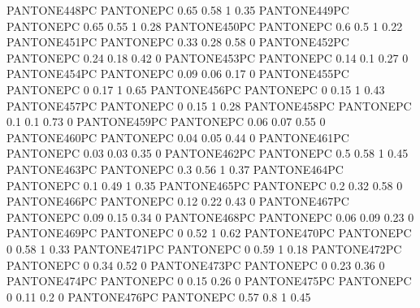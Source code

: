  {PANTONE448PC} {PANTONE\SpotSpace PC} {0.65 0.58 1 0.35}
 {PANTONE449PC} {PANTONE\SpotSpace PC} {0.65 0.55 1 0.28}
 {PANTONE450PC} {PANTONE\SpotSpace PC} {0.6 0.5 1 0.22}
 {PANTONE451PC} {PANTONE\SpotSpace PC} {0.33 0.28 0.58 0}
 {PANTONE452PC} {PANTONE\SpotSpace PC} {0.24 0.18 0.42 0}
 {PANTONE453PC} {PANTONE\SpotSpace PC} {0.14 0.1 0.27 0}
 {PANTONE454PC} {PANTONE\SpotSpace PC} {0.09 0.06 0.17 0}
 {PANTONE455PC} {PANTONE\SpotSpace PC} {0 0.17 1 0.65}
 {PANTONE456PC} {PANTONE\SpotSpace PC} {0 0.15 1 0.43}
 {PANTONE457PC} {PANTONE\SpotSpace PC} {0 0.15 1 0.28}
 {PANTONE458PC} {PANTONE\SpotSpace PC} {0.1 0.1 0.73 0}
 {PANTONE459PC} {PANTONE\SpotSpace PC} {0.06 0.07 0.55 0}
 {PANTONE460PC} {PANTONE\SpotSpace PC} {0.04 0.05 0.44 0}
 {PANTONE461PC} {PANTONE\SpotSpace PC} {0.03 0.03 0.35 0}
 {PANTONE462PC} {PANTONE\SpotSpace PC} {0.5 0.58 1 0.45}
 {PANTONE463PC} {PANTONE\SpotSpace PC} {0.3 0.56 1 0.37}
 {PANTONE464PC} {PANTONE\SpotSpace PC} {0.1 0.49 1 0.35}
 {PANTONE465PC} {PANTONE\SpotSpace PC} {0.2 0.32 0.58 0}
 {PANTONE466PC} {PANTONE\SpotSpace PC} {0.12 0.22 0.43 0}
 {PANTONE467PC} {PANTONE\SpotSpace PC} {0.09 0.15 0.34 0}
 {PANTONE468PC} {PANTONE\SpotSpace PC} {0.06 0.09 0.23 0}
 {PANTONE469PC} {PANTONE\SpotSpace PC} {0 0.52 1 0.62}
 {PANTONE470PC} {PANTONE\SpotSpace PC} {0 0.58 1 0.33}
 {PANTONE471PC} {PANTONE\SpotSpace PC} {0 0.59 1 0.18}
 {PANTONE472PC} {PANTONE\SpotSpace PC} {0 0.34 0.52 0}
 {PANTONE473PC} {PANTONE\SpotSpace PC} {0 0.23 0.36 0}
 {PANTONE474PC} {PANTONE\SpotSpace PC} {0 0.15 0.26 0}
 {PANTONE475PC} {PANTONE\SpotSpace PC} {0 0.11 0.2 0}
 {PANTONE476PC} {PANTONE\SpotSpace PC} {0.57 0.8 1 0.45}
